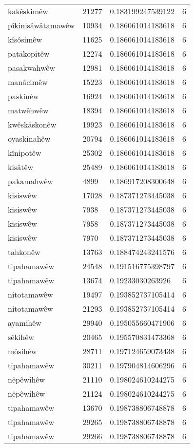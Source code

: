 \begin{longtable}{llll}
kakêskimêw & 21277 & 0.183199247539122 & 6\\
pîkinisâwâtamawêw & 10934 & 0.186061014183618 & 6\\
kîsôsimêw & 11625 & 0.186061014183618 & 6\\
patakopitêw & 12274 & 0.186061014183618 & 6\\
pasakwahwêw & 12981 & 0.186061014183618 & 6\\
manâcimêw & 15223 & 0.186061014183618 & 6\\
paskinêw & 16924 & 0.186061014183618 & 6\\
matwêhwêw & 18394 & 0.186061014183618 & 6\\
kwêskâskonêw & 19923 & 0.186061014183618 & 6\\
oyaskinahêw & 20794 & 0.186061014183618 & 6\\
kînipotêw & 25302 & 0.186061014183618 & 6\\
kisâtêw & 25489 & 0.186061014183618 & 6\\
pakamahwêw & 4899 & 0.186917208300648 & 6\\
kisiswêw & 17028 & 0.187371273445038 & 6\\
kisiswêw & 7938 & 0.187371273445038 & 6\\
kisiswêw & 7958 & 0.187371273445038 & 6\\
kisiswêw & 7970 & 0.187371273445038 & 6\\
tahkonêw & 13763 & 0.188474243241576 & 6\\
tipahamawêw & 24548 & 0.191516775398797 & 6\\
tipahamawêw & 13674 & 0.19233030263926 & 6\\
nitotamawêw & 19497 & 0.193852737105414 & 6\\
nitotamawêw & 21293 & 0.193852737105414 & 6\\
ayamihêw & 29940 & 0.195055660471906 & 6\\
sêkihêw & 20465 & 0.195570831473368 & 6\\
môsihêw & 28711 & 0.197124659073438 & 6\\
tipahamawêw & 30211 & 0.197904814606296 & 6\\
nêpêwihêw & 21110 & 0.198024610244275 & 6\\
nêpêwihêw & 21124 & 0.198024610244275 & 6\\
tipahamawêw & 13670 & 0.198738806748878 & 6\\
tipahamawêw & 29265 & 0.198738806748878 & 6\\
tipahamawêw & 29266 & 0.198738806748878 & 6\\

\end{longtable}
